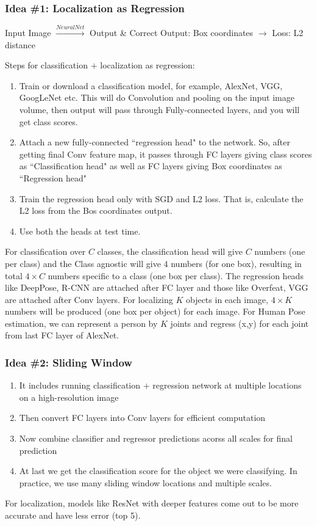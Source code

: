 \documentclass[12pt,a4paper]{article}
\begin{document}
\subsubsection{Idea \#1: Localization as Regression}
\begin{center}
    {\small Input Image $\xrightarrow{Neural Net}$ Output \& Correct Output: Box coordinates $\xrightarrow{}$ Loss: L2 distance}
\end{center}
Steps for classification $+$ localization as regression:
\begin{enumerate}
    \item Train or download a classification model, for example, AlexNet, VGG, GoogLeNet etc. This will do Convolution and pooling on the input image volume, then output will pass through Fully-connected layers, and you will get class scores.
    \item Attach a new fully-connected ``regression head" to the network. So, after getting final Conv feature map, it passes through FC layers giving class scores as ``Classification head" as well as FC layers giving Box coordinates as ``Regression head"
    \item Train the regression head only with SGD and L2 loss. That is, calculate the L2 loss from the Bos coordinates output.
    \item Use both the heads at test time.
\end{enumerate} 
For classification over $C$ classes, the classification head will give $C$ numbers (one per class) and the Class agnostic will give $4$ numbers (for one box), resulting in total $4 \times C$ numbers specific to a class (one box per class). The regression heads like DeepPose, R-CNN are attached after FC layer and those like Overfeat, VGG are attached after Conv layers. For localizing $K$ objects in each image, $4 \times K$ numbers will be produced (one box per object) for each image. For Human Pose estimation, we can represent a person by $K$ joints and regress (x,y) for each joint from last FC layer of AlexNet.

\subsubsection{Idea \#2: Sliding Window}
\begin{enumerate}
    \item It includes running classification $+$ regression network at multiple locations on a high-resolution image
    \item Then convert FC layers into Conv layers for efficient computation
    \item Now combine classifier and regressor predictions acorss all scales for final prediction
    \item At last we get the classification score for the object we were classifying. In practice, we use many sliding window locations and multiple scales.
\end{enumerate}
For localization, models like ResNet with deeper features come out to be more accurate and have less error (top 5).
\end{document}
